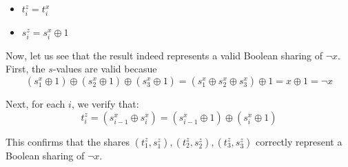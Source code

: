 \begin{itemize}
    \item $t^z_i = t^x_i$
    \item $s^z_i = s^x_i \oplus 1$
\end{itemize}

Now, let us see that the result indeed represents a valid Boolean sharing of $\neg x$. First, the $s$-values are valid becasue
\begin{equation}
    (s^x_1 \oplus 1) \oplus (s^x_2 \oplus 1) \oplus (s^x_3 \oplus 1) = (s^x_1 \oplus s^x_2 \oplus s^x_3) \oplus 1 = x \oplus 1 = \neg x
\end{equation}

Next, for each $i$, we verify that:
\begin{equation}
    t^z_i = (s^x_{i - 1} \oplus s^x_i) = (s^x_{i - 1} \oplus 1) \oplus (s^x_i \oplus 1)
\end{equation}

This confirms that the shares $(t^z_1, s^z_1), (t^z_2, s^z_2), (t^z_3, s^z_3)$ correctly represent a Boolean sharing of $\neg x$.
